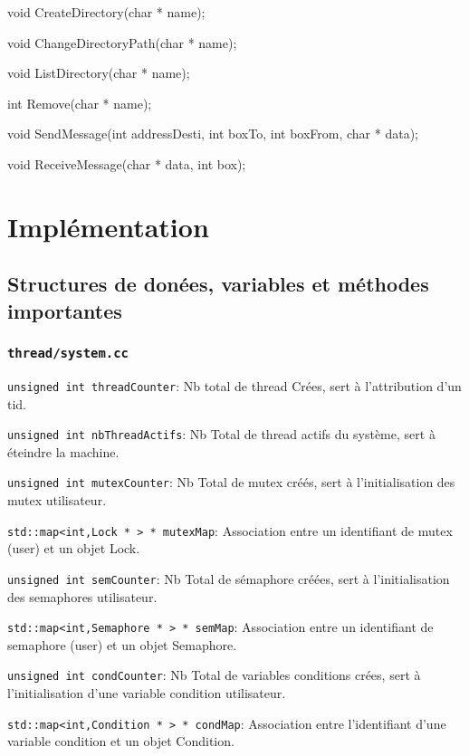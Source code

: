 \documentclass[11pt]{article}
\begin{document}
void CreateDirectory(char * name);

void ChangeDirectoryPath(char * name);

void ListDirectory(char * name);

int Remove(char * name);

void SendMessage(int addressDesti, int boxTo, int boxFrom, char * data);

void ReceiveMessage(char * data, int box);


\section{Implémentation}

\subsection{Structures de donées, variables et méthodes importantes}
\subsubsection{\texttt{thread/system.cc}}

\texttt{unsigned int threadCounter}: Nb total de thread Crées, sert à l'attribution d'un tid.

\texttt{unsigned int nbThreadActifs}: Nb Total de thread actifs du système, sert à éteindre la machine.

\texttt{unsigned int mutexCounter}: Nb Total de mutex créés, sert à l'initialisation des mutex utilisateur.

\texttt{std::map<int,Lock * > * mutexMap}: Association entre un identifiant de mutex (user) et un objet Lock.

\texttt{unsigned int semCounter}: Nb Total de sémaphore créées, sert à l'initialisation des semaphores utilisateur.

\texttt{std::map<int,Semaphore * > * semMap}: Association entre un identifiant de semaphore (user) et un objet Semaphore.

\texttt{unsigned int condCounter}: Nb Total de variables conditions crées, sert à l'initialisation d'une variable
condition utilisateur.

\texttt{std::map<int,Condition * > * condMap}: Association entre l'identifiant d'une variable condition et
un objet Condition.
\end{document}
